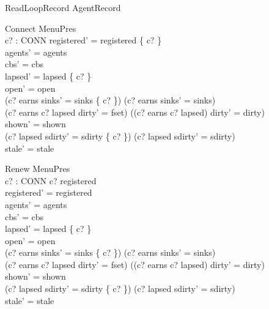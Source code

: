 \documentclass[a4paper,10pt,fleqn]{article}
\begin{document}
\begin{zed}
  ReadLoopRecord  AgentRecord \land
    [\Delta MenuPres; c? : CONN | open' = open \land c? \in open]
\end{zed}

\begin{schema}{Connect}
  \Delta MenuPres \\
  c? : CONN
\where
  registered' = registered \cup \{ c? \} \\
  agents' = agents \\
  cbs' = cbs \\
  lapsed' = lapsed \setminus \{ c? \} \\
  open' = open \\
  (c? \in earns \land sinks' = sinks \oplus \{ c?  \}) \lor
    (c? \notin earns \land sinks' = sinks) \\
  (c? \in earns \land c? \in lapsed \land dirty' = fset) \lor
    (\lnot (c? \in earns \land c? \in lapsed) \land dirty' = dirty) \\
  shown' = shown \\
  (c? \in lapsed \land sdirty' = sdirty \cup \{ c? \}) \lor
    (c? \notin lapsed \land sdirty' = sdirty) \\
  stale' = stale
\end{schema}

\begin{schema}{Renew}
  \Delta MenuPres \\
  c? : CONN
\where
  c? \in registered \\
  registered' = registered \\
  agents' = agents \\
  cbs' = cbs \\
  lapsed' = lapsed \setminus \{ c? \} \\
  open' = open \\
  (c? \in earns \land sinks' = sinks \oplus \{ c?  \}) \lor
    (c? \notin earns \land sinks' = sinks) \\
  (c? \in earns \land c? \in lapsed \land dirty' = fset) \lor
    (\lnot (c? \in earns \land c? \in lapsed) \land dirty' = dirty) \\
  shown' = shown \\
  (c? \in lapsed \land sdirty' = sdirty \cup \{ c? \}) \lor
    (c? \notin lapsed \land sdirty' = sdirty) \\
  stale' = stale
\end{schema}
\end{document}
